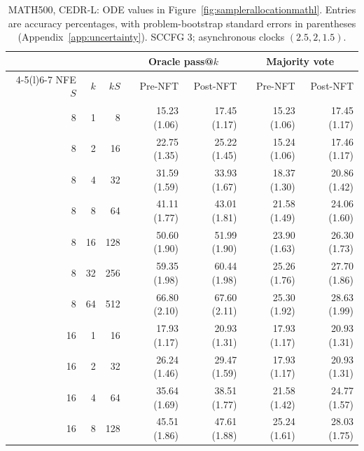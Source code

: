 \documentclass[11pt,letterpaper]{article}
\begin{document}
\begin{table}[p]
\centering\small
\setlength{\tabcolsep}{5pt}
\caption{MATH500, CEDR-L: ODE values in Figure~\ref{fig:samplerallocationmathl}. Entries are accuracy percentages, with problem-bootstrap standard errors in parentheses (Appendix~\ref{app:uncertainty}). SCCFG 3; asynchronous clocks $(2.5,2,1.5)$.}
\label{tab:samplerbudgetmathlode}
\begin{tabular}{@{}rrr rrrr@{}}
\toprule
& & & \multicolumn{2}{c}{Oracle pass@$k$} & \multicolumn{2}{c}{Majority vote} \\
\cmidrule(lr){4-5}\cmidrule(l){6-7}
NFE $S$ & $k$ & $kS$ & Pre-NFT & Post-NFT & Pre-NFT & Post-NFT \\
\midrule
8 & 1 & 8 & 15.23 {\scriptsize (1.06)} & 17.45 {\scriptsize (1.17)} & 15.23 {\scriptsize (1.06)} & 17.45 {\scriptsize (1.17)} \\
8 & 2 & 16 & 22.75 {\scriptsize (1.35)} & 25.22 {\scriptsize (1.45)} & 15.24 {\scriptsize (1.06)} & 17.46 {\scriptsize (1.17)} \\
8 & 4 & 32 & 31.59 {\scriptsize (1.59)} & 33.93 {\scriptsize (1.67)} & 18.37 {\scriptsize (1.30)} & 20.86 {\scriptsize (1.42)} \\
8 & 8 & 64 & 41.11 {\scriptsize (1.77)} & 43.01 {\scriptsize (1.81)} & 21.58 {\scriptsize (1.49)} & 24.06 {\scriptsize (1.60)} \\
8 & 16 & 128 & 50.60 {\scriptsize (1.90)} & 51.99 {\scriptsize (1.90)} & 23.90 {\scriptsize (1.63)} & 26.30 {\scriptsize (1.73)} \\
8 & 32 & 256 & 59.35 {\scriptsize (1.98)} & 60.44 {\scriptsize (1.98)} & 25.26 {\scriptsize (1.76)} & 27.70 {\scriptsize (1.86)} \\
8 & 64 & 512 & 66.80 {\scriptsize (2.10)} & 67.60 {\scriptsize (2.11)} & 25.30 {\scriptsize (1.92)} & 28.63 {\scriptsize (1.99)} \\
\midrule
16 & 1 & 16 & 17.93 {\scriptsize (1.17)} & 20.93 {\scriptsize (1.31)} & 17.93 {\scriptsize (1.17)} & 20.93 {\scriptsize (1.31)} \\
16 & 2 & 32 & 26.24 {\scriptsize (1.46)} & 29.47 {\scriptsize (1.59)} & 17.93 {\scriptsize (1.17)} & 20.93 {\scriptsize (1.31)} \\
16 & 4 & 64 & 35.64 {\scriptsize (1.69)} & 38.51 {\scriptsize (1.77)} & 21.58 {\scriptsize (1.42)} & 24.77 {\scriptsize (1.57)} \\
16 & 8 & 128 & 45.51 {\scriptsize (1.86)} & 47.61 {\scriptsize (1.88)} & 25.24 {\scriptsize (1.61)} & 28.03 {\scriptsize (1.75)} \\

\end{tabular}
\end{table}
\end{document}
